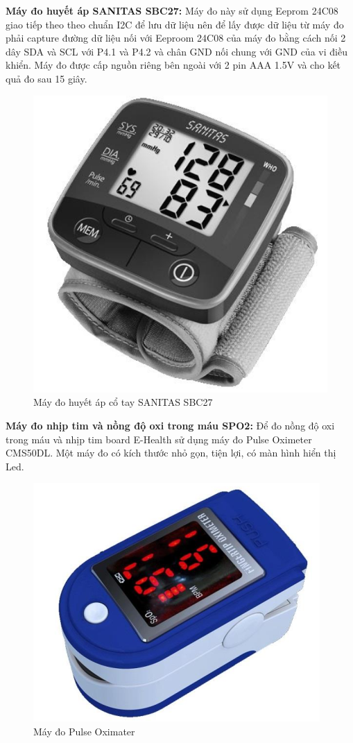\documentclass{report}
\begin{document}
\textbf{Máy đo huyết áp SANITAS SBC27:} Máy đo này sử dụng Eeprom 24C08 giao tiếp theo theo chuẩn I2C để lưu dữ liệu nên để lấy được dữ liệu từ máy đo phải capture đường dữ liệu nối với Eeproom 24C08 của máy
đo bằng cách nối 2 dây SDA và SCL với P4.1 và P4.2 và chân GND nối chung với GND của vi điều khiển. Máy đo
được cấp nguồn riêng bên ngoài với 2 pin AAA 1.5V và cho kết quả đo sau 15 giây.
\newpage
\begin{figure}[h]
	\centering
	\includegraphics[scale = 0.4]{fig45.png}
	\caption{Máy đo huyết áp cổ tay SANITAS SBC27}
	\label{fig:Graph45}
\end{figure}
\textbf{Máy đo nhịp tim và nồng độ oxi trong máu SPO2:} Để đo nồng độ oxi trong máu và nhịp tim board E-Health sử dụng máy đo Pulse Oximeter CMS50DL. Một máy đo có kích thước nhỏ gọn, tiện lợi, có màn hình hiển thị Led.
\begin{figure}[h]
	\centering
	\includegraphics[scale = 0.5]{fig46.png}
	\caption{Máy đo Pulse Oximater}
	\label{fig:Graph46}
\end{figure}
\end{document}

